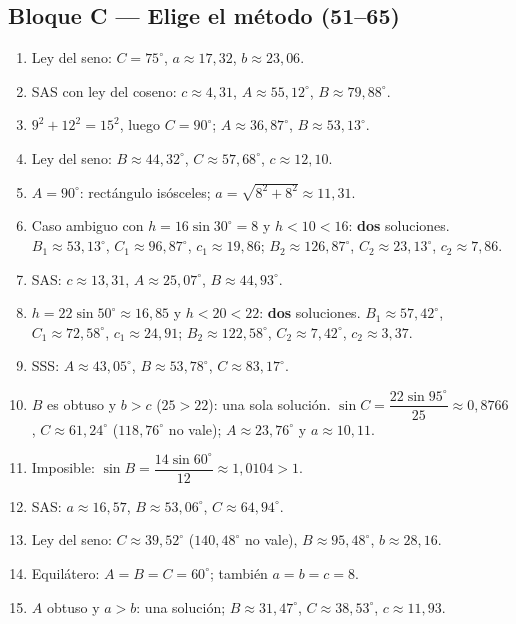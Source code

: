 \documentclass[12pt, letterpaper]{article}
\providecommand{\sen}{\sin}
\begin{document}
\subsection*{Bloque C — Elige el método (51--65)}
\begin{enumerate}[leftmargin=*, label=\textbf{\arabic*.}, start=51]
  \item Ley del seno: $C=75^\circ$, $a\approx 17{,}32$, $b\approx 23{,}06$.
  \item SAS con ley del coseno: $c\approx 4{,}31$, $A\approx 55{,}12^\circ$, $B\approx 79{,}88^\circ$.
  \item $9^2+12^2=15^2$, luego $C=90^\circ$; $A\approx 36{,}87^\circ$, $B\approx 53{,}13^\circ$.
  \item Ley del seno: $B\approx 44{,}32^\circ$, $C\approx 57{,}68^\circ$, $c\approx 12{,}10$.
  \item $A=90^\circ$: rectángulo isósceles; $a=\sqrt{8^2+8^2}\approx 11{,}31$.
  \item Caso ambiguo con $h=16\sen 30^\circ=8$ y $h<10<16$: \textbf{dos} soluciones. $B_1\approx 53{,}13^\circ$, $C_1\approx 96{,}87^\circ$, $c_1\approx 19{,}86$; $B_2\approx 126{,}87^\circ$, $C_2\approx 23{,}13^\circ$, $c_2\approx 7{,}86$.
  \item SAS: $c\approx 13{,}31$, $A\approx 25{,}07^\circ$, $B\approx 44{,}93^\circ$.
  \item $h=22\sen 50^\circ\approx 16{,}85$ y $h<20<22$: \textbf{dos} soluciones. $B_1\approx 57{,}42^\circ$, $C_1\approx 72{,}58^\circ$, $c_1\approx 24{,}91$; $B_2\approx 122{,}58^\circ$, $C_2\approx 7{,}42^\circ$, $c_2\approx 3{,}37$.
  \item SSS: $A\approx 43{,}05^\circ$, $B\approx 53{,}78^\circ$, $C\approx 83{,}17^\circ$.
  \item $B$ es obtuso y $b>c$ ($25>22$): una sola solución. $\sen C=\dfrac{22\sen 95^\circ}{25}\approx 0{,}8766$, $C\approx 61{,}24^\circ$ ($118{,}76^\circ$ no vale); $A\approx 23{,}76^\circ$ y $a\approx 10{,}11$.
  \item Imposible: $\sen B=\dfrac{14\sen 60^\circ}{12}\approx 1{,}0104>1$.
  \item SAS: $a\approx 16{,}57$, $B\approx 53{,}06^\circ$, $C\approx 64{,}94^\circ$.
  \item Ley del seno: $C\approx 39{,}52^\circ$ ($140{,}48^\circ$ no vale), $B\approx 95{,}48^\circ$, $b\approx 28{,}16$.
  \item Equilátero: $A=B=C=60^\circ$; también $a=b=c=8$.
  \item $A$ obtuso y $a>b$: una solución; $B\approx 31{,}47^\circ$, $C\approx 38{,}53^\circ$, $c\approx 11{,}93$.
\end{enumerate}
\end{document}
